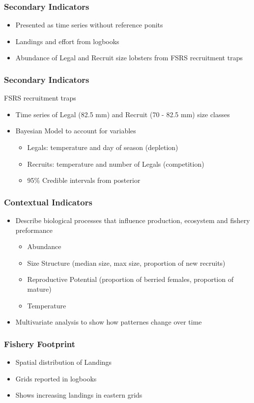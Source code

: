 \documentclass{beamer}
\begin{document}
\begin{frame}
\frametitle{Secondary Indicators}
\begin{itemize}
    \setlength\itemsep{2em}
\item Presented as time series without reference ponits
\item Landings and effort from logbooks
\item Abundance of Legal and Recruit size lobsters from FSRS recruitment traps 
\end{itemize}
\end{frame}


\begin{frame}
\frametitle{Secondary Indicators}
FSRS recruitment traps
\begin{itemize}
    \setlength\itemsep{1em}
\item Time series of Legal (82.5 mm) and Recruit (70 - 82.5 mm) size classes 
\item Bayesian Model to account for variables
\begin{itemize}
\item Legals: temperature and day of season (depletion) 
\item Recruits: temperature and number of Legals (competition) 
\item 95\% Credible intervals from posterior
\end{itemize}
\end{itemize}
\end{frame}


\begin{frame}
\frametitle{Contextual Indicators}
\begin{itemize}
    \setlength\itemsep{1em}
\item Describe biological processes that influence production, ecosystem and fishery preformance
\begin{itemize}
\item Abundance 
\item Size Structure (median size, max size, proportion of new recruits)
\item Reproductive Potential (proportion of berried females, proportion of mature)
\item Temperature 
\end{itemize}
\item Multivariate analysis to show how patternes change over time 
\end{itemize}
\end{frame}


\begin{frame}
\frametitle{Fishery Footprint}
\begin{itemize}
    \setlength\itemsep{2em}
\item Spatial distribution of Landings
\item Grids reported in logbooks
\item Shows increasing landings in eastern grids
\end{itemize}
\end{frame}
\end{document}
